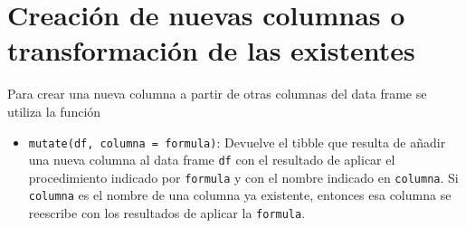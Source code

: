 \documentclass[
  spanish,
  a4paper,
]{scrreport}
\providecommand{\tightlist}{%
  \setlength{\itemsep}{0pt}\setlength{\parskip}{0pt}}
\theoremstyle{definition}
\theoremstyle{definition}
\theoremstyle{remark}
\begin{document}
\section{Creación de nuevas columnas o transformación de las
existentes}\label{creaciuxf3n-de-nuevas-columnas-o-transformaciuxf3n-de-las-existentes}

Para crear una nueva columna a partir de otras columnas del data frame
se utiliza la función

\begin{itemize}
\tightlist
\item
  \texttt{mutate(df,\ columna\ =\ formula)}: Devuelve el tibble que
  resulta de añadir una nueva columna al data frame \texttt{df} con el
  resultado de aplicar el procedimiento indicado por \texttt{formula} y
  con el nombre indicado en \texttt{columna}. Si \texttt{columna} es el
  nombre de una columna ya existente, entonces esa columna se reescribe
  con los resultados de aplicar la \texttt{formula}.
\end{itemize}
\end{document}

